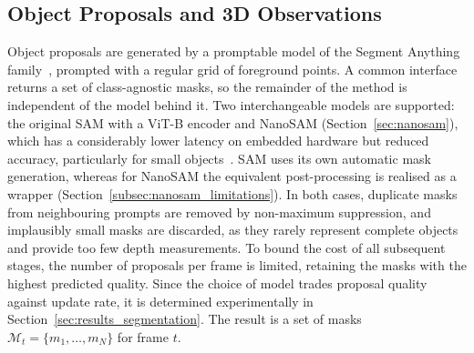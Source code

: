 \subsection{Object Proposals and 3D Observations}
\label{subsec:method_proposals}
{\small
Object proposals are generated by a promptable model of the Segment Anything family~\cite{kirillov2023segmentanything}, prompted with a regular grid of foreground points. A common interface returns a set of class-agnostic masks, so the remainder of the method is independent of the model behind it. Two interchangeable models are supported: the original SAM with a ViT-B encoder and NanoSAM (Section~\ref{sec:nanosam}), which has a considerably lower latency on embedded hardware but reduced accuracy, particularly for small objects~\cite{nanosam2023}. SAM uses its own automatic mask generation, whereas for NanoSAM the equivalent post-processing is realised as a wrapper (Section~\ref{subsec:nanosam_limitations}). In both cases, duplicate masks from neighbouring prompts are removed by non-maximum suppression, and implausibly small masks are discarded, as they rarely represent complete objects and provide too few depth measurements. To bound the cost of all subsequent stages, the number of proposals per frame is limited, retaining the masks with the highest predicted quality. Since the choice of model trades proposal quality against update rate, it is determined experimentally in Section~\ref{sec:results_segmentation}. The result is a set of masks $\mathcal{M}_t = \{m_1, \dots, m_N\}$ for frame $t$.

}
